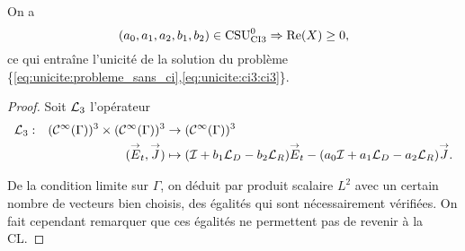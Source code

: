  \begin{prop}
    \label{prop:csu:ci3-0}
    On a 
    \begin{equation*}
      (a_0,a_1,a_2,b_1,b_2) \in \CSU[0]{CI3} \Rightarrow \Re(X)\ge 0,
    \end{equation*}
    ce qui entraîne l'unicité de la solution du problème \{\eqref{eq:unicite:probleme_sans_ci},\eqref{eq:unicite:ci3:ci3}\}.
  \end{prop}
  \begin{proof}
    Soit \(\LL_3\) l'opérateur
    \begin{equation}
      \label{eq:unicite:ci3:L3}
      \fonction{\LL_3}{(\mathcal{C}^\infty(\Gamma))^3 \times (\mathcal{C}^\infty(\Gamma))^3}{(\mathcal{C}^\infty(\Gamma))^3}
      {(\vE_t,\vJ)}{( \oI + b_1 \LD - b_2 \LR) \vE_t - (a_0\oI + a_1 \LD - a_2 \LR ) \vJ.}
    \end{equation}

    De la condition limite sur \(\Gamma\), on déduit par produit scalaire \(L^2\) avec un certain nombre de vecteurs bien choisis, des égalités qui sont nécessairement vérifiées.
    On fait cependant remarquer que ces égalités ne  permettent  pas de revenir  à la CL.


\end{proof}
